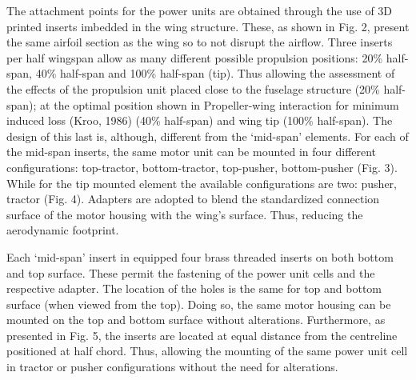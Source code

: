 \documentclass[../../main.tex]{subfiles}
\begin{document}
The attachment points for the power units are obtained through the use of 3D printed inserts imbedded in the wing structure.
These, as shown in Fig. 2, present the same airfoil section as the wing so to not disrupt the airflow.
Three inserts per half wingspan allow as many different possible propulsion positions: 20\% half-span, 40\% half-span and 100\% half-span (tip).
Thus allowing the assessment of the effects of the propulsion unit placed close to the fuselage structure (20\% half-span); at the optimal position shown in Propeller-wing interaction for minimum induced loss (Kroo, 1986) (40\% half-span) and wing tip (100\% half-span).
The design of this last is, although, different from the ‘mid-span’ elements.
For each of the mid-span inserts, the same motor unit can be mounted in four different configurations: top-tractor, bottom-tractor, top-pusher, bottom-pusher (Fig. 3).
While for the tip mounted element the available configurations are two: pusher, tractor (Fig. 4).
Adapters are adopted to blend the standardized connection surface of the motor housing with the wing’s surface.
Thus, reducing the aerodynamic footprint. 


Each ‘mid-span’ insert in equipped four brass threaded inserts on both bottom and top surface.
These permit the fastening of the power unit cells and the respective adapter.
The location of the holes is the same for top and bottom surface (when viewed from the top).
Doing so, the same motor housing can be mounted on the top and bottom surface without alterations.
Furthermore, as presented in Fig. 5, the inserts are located at equal distance from the centreline positioned at half chord.
Thus, allowing the mounting of the same power unit cell in tractor or pusher configurations without the need for alterations. 

\end{document}
